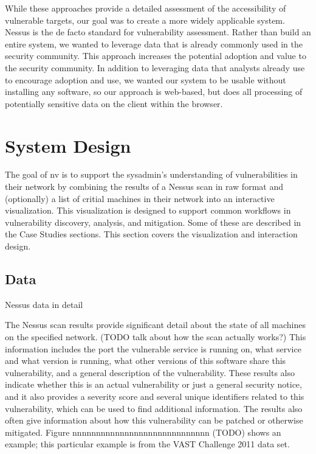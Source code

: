 \documentclass{acm_proc_article-sp}
\begin{document}
While these approaches provide a detailed assessment of the accessibility of vulnerable targets, our goal was to create a more widely applicable system. Nessus is the de facto standard for vulnerability assessment. Rather than build an entire system, we wanted to leverage data that is already commonly used in the security community. This approach increases the potential adoption and value to the security community. In addition to leveraging data that analysts already use to encourage adoption and use, we wanted our system to be usable without installing any software, so our approach is web-based, but does all processing of potentially sensitive data on the client within the browser.

\section{System Design}
The goal of nv is to support the sysadmin's understanding of vulnerabilities in their network by combining the results of a Nessus scan in raw format and (optionally) a list of critial machines in their network into an interactive visualization.
This visualization is designed to support common workflows in vulnerability discovery, analysis, and mitigation.
Some of these are described in the Case Studies sections.
This section covers the visualization and interaction design.

\subsection{Data}
Nessus data in detail

The Nessus scan results provide significant detail about the state of all machines on the specified network.
(TODO talk about how the scan actually works?) This information includes the port the vulnerable service is running on, what service and what version is running, what other versions of this software share this vulnerability, and a general description of the vulnerability.
These results also indicate whether this is an actual vulnerability or just a general security notice, and it also provides a severity score and several unique identifiers related to this vulnerability, which can be used to find additional information.
The results also often give information about how this vulnerability can be patched or otherwise mitigated.
Figure nnnnnnnnnnnnnnnnnnnnnnnnnnnnn (TODO) shows an example; this particular example is from the VAST Challenge 2011 data set.
\end{document}
